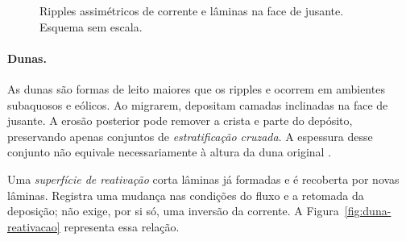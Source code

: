 \begin{figure}[htbp]
\centering
{}
\caption{Ripples assimétricos de corrente e lâminas na face de jusante.
Esquema sem escala.}
\label{fig:ripples-corrente}
\end{figure}

\paragraph{Dunas.}
As dunas são formas de leito maiores que os ripples e ocorrem em ambientes
subaquosos e eólicos. Ao migrarem, depositam camadas inclinadas na face de
jusante. A erosão posterior pode remover a crista e parte do depósito,
preservando apenas conjuntos de \emph{estratificação cruzada}. A espessura
desse conjunto não equivale necessariamente à altura da duna original
\autocite{southard2006bedforms,southard2006cross}.

Uma \emph{superfície de reativação} corta lâminas já formadas e é recoberta
por novas lâminas. Registra uma mudança nas condições do fluxo e a retomada
da deposição; não exige, por si só, uma inversão da corrente. A
Figura~\ref{fig:duna-reativacao} representa essa relação.

